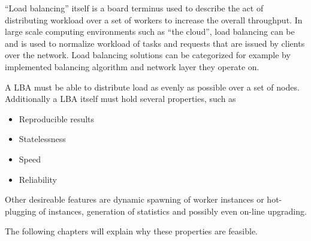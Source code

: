 ``Load balancing'' itself is a board terminus used to describe the act of
distributing workload over a set of workers to increase the overall throughput.
In large scale computing environments such as ``the cloud'', load balancing can
be and is used to normalize workload of tasks and requests that are issued by
clients over the network.
Load balancing solutions can be categorized for example by implemented balancing
algorithm and network layer they operate on.

A \ac{LBA} must be able to distribute load as evenly as possible
over a set of nodes.
Additionally a \ac{LBA} itself must hold several properties,
such as
\begin{itemize}
    \item Reproducible results
    \item Statelessness
    \item Speed
    \item Reliability
\end{itemize}
Other desireable features are dynamic spawning of worker instances or
hot-plugging of instances, generation of statistics and possibly even on-line
upgrading.

The following chapters will explain why these properties are feasible.

